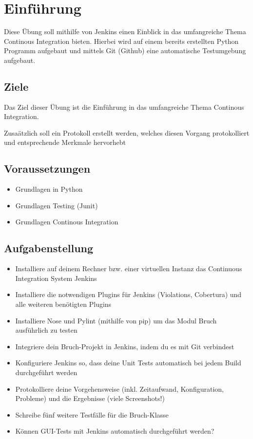 
\section{Einführung}
Diese Übung soll mithilfe von Jenkins einen Einblick in das umfangreiche Thema Continous Integration bieten. Hierbei wird auf einem bereits erstellten Python Programm aufgebaut und mittels Git (Github) eine automatische Testumgebung aufgebaut.

\subsection{Ziele}
Das Ziel dieser Übung ist die Einführung in das umfangreiche Thema Continous Integration.

Zusaätzlich soll ein Protokoll erstellt werden, welches diesen Vorgang protokolliert und entsprechende Merkmale hervorhebt
\subsection{Voraussetzungen}
\begin{itemize}
	\item Grundlagen in Python
	\item Grundlagen Testing (Junit)
	\item Grundlagen Continous Integration
\end{itemize}

\subsection{Aufgabenstellung}
\begin{minipage}{.5\textwidth}
	\begin{itemize}
		\item Installiere auf deinem Rechner bzw. einer virtuellen Instanz das Continuous Integration System Jenkins
		\item Installiere die notwendigen Plugins für Jenkins (Violations, Cobertura) und alle weiteren benötigten Plugins
		\item Installiere Nose und Pylint (mithilfe von pip) um das Modul Bruch ausführlich zu testen
		\item Integriere dein Bruch-Projekt in Jenkins, indem du es mit Git verbindest
	\end{itemize}
\end{minipage}%
\begin{minipage}{.5\textwidth}
	\begin{itemize}
		\item Konfiguriere Jenkins so, dass deine Unit Tests automatisch bei jedem Build durchgeführt werden
		\item Protokolliere deine Vorgehensweise (inkl. Zeitaufwand, Konfiguration, Probleme) und die Ergebnisse (viele Screenshots!)
		\item Schreibe fünf weitere Testfälle für die Bruch-Klasse
		\item Können GUI-Tests mit Jenkins automatisch durchgeführt werden?
	\end{itemize}
\end{minipage}
\clearpage

